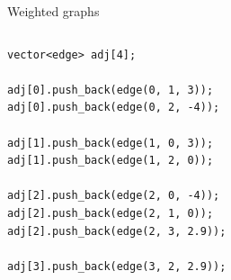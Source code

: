 \documentclass{beamer}
\begin{document}
\begin{frame}{Weighted graphs}
    \begin{columns}[T]
        \begin{column}{.4\textwidth}
            \begin{verbatim}
vector<edge> adj[4];

adj[0].push_back(edge(0, 1, 3));
adj[0].push_back(edge(0, 2, -4));

adj[1].push_back(edge(1, 0, 3));
adj[1].push_back(edge(1, 2, 0));

adj[2].push_back(edge(2, 0, -4));
adj[2].push_back(edge(2, 1, 0));
adj[2].push_back(edge(2, 3, 2.9));

adj[3].push_back(edge(3, 2, 2.9));

            \end{verbatim}
        \end{column}%
        \hfill%
        \begin{column}{.6\textwidth}
            \begin{figure}
            \end{figure}
        \end{column}%
    \end{columns}
\end{frame}
\end{document}
